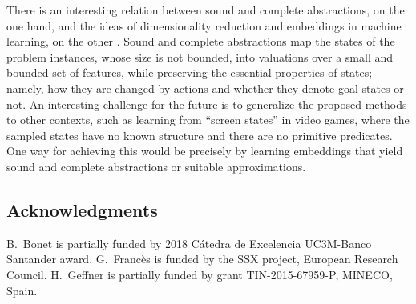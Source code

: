 \documentclass[letterpaper]{article} %
\begin{document}
There is  an interesting  relation between sound and complete abstractions, on the one hand,
and the ideas of dimensionality reduction and embeddings in machine learning, on the other
\cite{hamilton:embeddings}. Sound and complete abstractions  map  the  states of the problem
instances,  whose size is not bounded, into valuations over a small and bounded set of features,
while preserving the   essential properties of states; namely,  how they are changed by actions
and whether they denote  goal states or not.
An interesting challenge for the future  is to generalize the proposed methods
to other contexts, such as learning from ``screen states'' in video games,
where the sampled states have no known structure and there are no primitive
predicates. One way for achieving this would be precisely by learning embeddings
that yield sound and complete abstractions or suitable approximations.


\subsection*{Acknowledgments}
B.\ Bonet is partially funded by 2018 C\'atedra de Excelencia UC3M-Banco Santander award.
G.\ Franc\`{e}s is funded by the SSX project, European Research Council.
H.\ Geffner is partially funded by grant TIN-2015-67959-P, MINECO, Spain.



\end{document}
